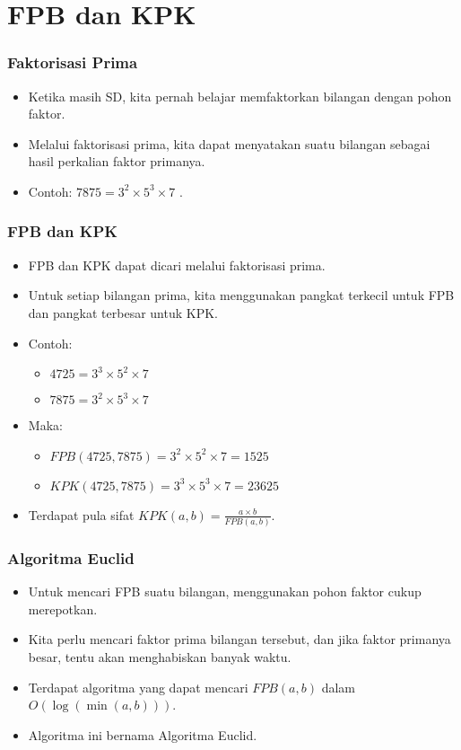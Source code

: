 \section{FPB dan KPK}
\frame{\sectionpage}

\begin{frame}
\frametitle{Faktorisasi Prima}
\begin{itemize}
  \item Ketika masih SD, kita pernah belajar memfaktorkan bilangan dengan pohon faktor.
  \item Melalui faktorisasi prima, kita dapat menyatakan suatu bilangan sebagai hasil perkalian faktor primanya.
  \item Contoh: $7875 = 3^{2} \times 5^{3} \times 7$ .
\end{itemize}
\end{frame}

\begin{frame}
\frametitle{FPB dan KPK}
\begin{itemize}
  \item FPB dan KPK dapat dicari melalui faktorisasi prima. 
  \item Untuk setiap bilangan prima, kita menggunakan pangkat terkecil untuk FPB dan pangkat terbesar untuk KPK.
  \item Contoh:
  \begin{itemize}
    \item $4725 = 3^{3} \times 5^{2} \times 7$
    \item $7875 = 3^{2} \times 5^{3} \times 7$
  \end{itemize}
  \item Maka: 
  \begin{itemize}
    \item $FPB(4725,7875) = 3^{2} \times 5^{2} \times 7 = 1525$
    \item $KPK(4725,7875) = 3^{3} \times 5^{3} \times 7 = 23625$
    \newline
  \end{itemize}
  \item Terdapat pula sifat $KPK(a,b) = \frac{a \times b}{FPB(a,b)}$. 
\end{itemize}
\end{frame}

\begin{frame}
\frametitle{Algoritma Euclid}
\begin{itemize}
  \item Untuk mencari FPB suatu bilangan, menggunakan pohon faktor cukup merepotkan.
  \item Kita perlu mencari faktor prima bilangan tersebut, dan jika faktor primanya besar, tentu akan menghabiskan banyak waktu.
  \item Terdapat algoritma yang dapat mencari $FPB(a,b)$ dalam $O(\log{(\min{(a,b)})})$.
  \item Algoritma ini bernama Algoritma Euclid.
\end{itemize}
\end{frame}

